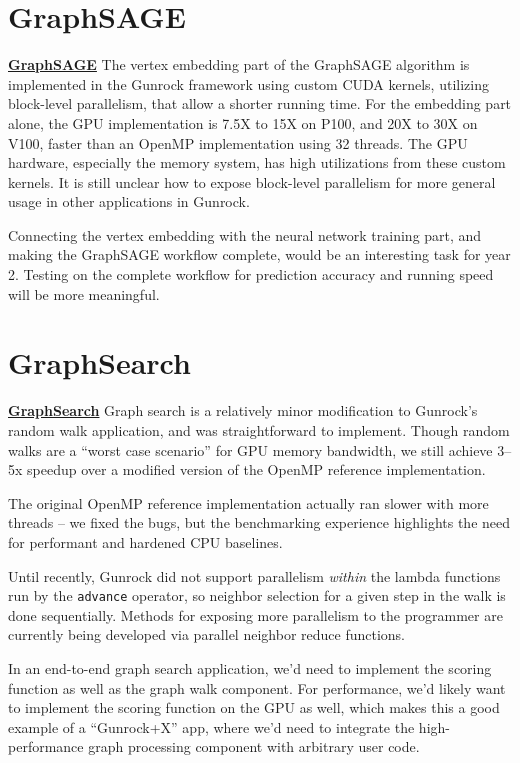 \documentclass[10pt,oneside]{memoir}
\begin{document}
\hypertarget{graphsage}{%
\section{GraphSAGE}\label{graphsage}}

\textbf{\href{https://gunrock.github.io/docs/hive_graphSage.html}{GraphSAGE}}
The vertex embedding part of the GraphSAGE algorithm is implemented in
the Gunrock framework using custom CUDA kernels, utilizing block-level
parallelism, that allow a shorter running time. For the embedding part
alone, the GPU implementation is 7.5X to 15X on P100, and 20X to 30X on
V100, faster than an OpenMP implementation using 32 threads. The GPU
hardware, especially the memory system, has high utilizations from these
custom kernels. It is still unclear how to expose block-level
parallelism for more general usage in other applications in Gunrock.

Connecting the vertex embedding with the neural network training part,
and making the GraphSAGE workflow complete, would be an interesting task
for year 2. Testing on the complete workflow for prediction accuracy and
running speed will be more meaningful.

\hypertarget{graphsearch}{%
\section{GraphSearch}\label{graphsearch}}

\textbf{\href{https://gunrock.github.io/docs/hive_graphsearch.html}{GraphSearch}}
Graph search is a relatively minor modification to Gunrock's random walk
application, and was straightforward to implement. Though random walks
are a ``worst case scenario'' for GPU memory bandwidth, we still achieve
3--5x speedup over a modified version of the OpenMP reference
implementation.

The original OpenMP reference implementation actually ran slower with
more threads -- we fixed the bugs, but the benchmarking experience
highlights the need for performant and hardened CPU baselines.

Until recently, Gunrock did not support parallelism \emph{within} the
lambda functions run by the \texttt{advance} operator, so neighbor
selection for a given step in the walk is done sequentially. Methods for
exposing more parallelism to the programmer are currently being
developed via parallel neighbor reduce functions.

In an end-to-end graph search application, we'd need to implement the
scoring function as well as the graph walk component. For performance,
we'd likely want to implement the scoring function on the GPU as well,
which makes this a good example of a ``Gunrock+X'' app, where we'd need
to integrate the high-performance graph processing component with
arbitrary user code.
\end{document}
